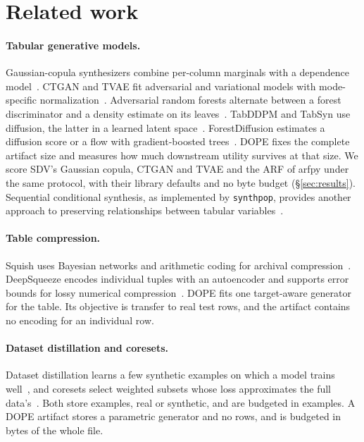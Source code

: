 \section{Related work}\label{sec:related}

\paragraph{Tabular generative models.}
Gaussian-copula synthesizers combine per-column marginals with a dependence model~\citep{sklar1959fonctions,patki2016sdv}.
CTGAN and TVAE fit adversarial and variational models with mode-specific normalization~\citep{xu2019ctgan}. Adversarial random forests alternate between a forest discriminator and a density estimate on its leaves~\citep{watson2023arf}. TabDDPM and TabSyn use diffusion, the latter in a learned latent space~\citep{kotelnikov2023tabddpm,zhang2024tabsyn}. ForestDiffusion estimates a diffusion score or a flow with gradient-boosted trees~\citep{jolicoeur2024forest}.
DOPE fixes the complete artifact size and measures how much downstream utility survives at that size.
We score SDV's Gaussian copula, CTGAN and TVAE and the ARF of arfpy under the same protocol, with their library defaults and no byte budget (\S\ref{sec:results}).
Sequential conditional synthesis, as implemented by \texttt{synthpop}, provides another approach to preserving relationships between tabular variables~\citep{nowok2016synthpop}.

\paragraph{Table compression.}
Squish uses Bayesian networks and arithmetic coding for archival compression~\citep{gao2016squish}. DeepSqueeze encodes individual tuples with an autoencoder and supports error bounds for lossy numerical compression~\citep{ilkhechi2020deepsqueeze}. DOPE fits one target-aware generator for the table. Its objective is transfer to real test rows, and the artifact contains no encoding for an individual row.

\paragraph{Dataset distillation and coresets.}
Dataset distillation learns a few synthetic examples on which a model trains well~\citep{wang2018distillation}, and coresets select weighted subsets whose loss approximates the full data's~\citep{bachem2017coresets,mirzasoleiman2020craig}.
Both store examples, real or synthetic, and are budgeted in examples.
A DOPE artifact stores a parametric generator and no rows, and is budgeted in bytes of the whole file.

